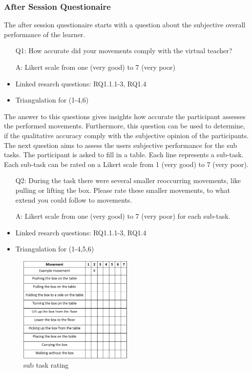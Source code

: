 \subsubsection{After Session Questionaire}
The after session questionaire starts with a question about the subjective overall performance of the learner. 
\begin{itemize}
	\item[Q1:] How accurate did your movements comply with the virtual teacher?
	\item[A:] Likert scale from one (very good) to 7 (very poor)
	\item Linked resarch questions: RQ1.1.1-3, RQ1.4
	\item Triangulation for (1-4,6)
\end{itemize}
The answer to this questions gives insights how accurate the participant assesses the performed movements. Furthermore, this question can be used to determine, if the qualitative accuracy comply with the subjective opinion of the participants. The next question aims to assess the users subjective performance for the sub tasks. The participant is asked to fill in a table. Each line represents a sub-task. Each sub-task can be rated on a Likert scale from 1 (very good) to 7 (very poor).
\begin{itemize}
	\item[Q2:] During the task there were several smaller reoccurring movements, like pulling or lifting the box. Please rate these smaller movements, to what extend you could follow to movements.
	\item[A:] Likert scale from one (very good) to 7 (very poor) for each sub-task.
	\item Linked resarch questions: RQ1.1.1-3, RQ1.4
	\item Triangulation for (1-4,5,6)
\end{itemize}
\begin{figure}[H]
	\centering
	\includegraphics[width=0.5\textwidth]{figures/sub-task-rating.png}
	\caption[sub task rating]{sub task rating}
	\label{fig:subtaskrating}
\end{figure}
